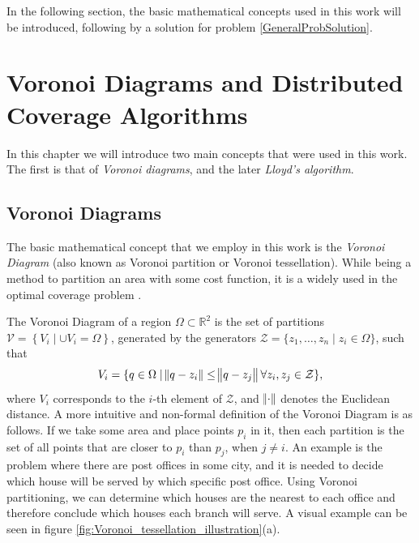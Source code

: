 \documentclass{iacas}
\newcommand{\rsqr}{\mathbb{R}^2}
\begin{document}
In the following section, the basic mathematical concepts used in this work will be introduced, following by a solution for problem \ref{GeneralProbSolution}.

\section{Voronoi Diagrams and Distributed Coverage Algorithms}
In this chapter we will introduce two main concepts that were used in this work. The first is that of \emph{Voronoi diagrams}, and the later \emph{Lloyd's algorithm}.
\subsection{Voronoi Diagrams}
The basic mathematical concept that we employ in this work is the \emph{Voronoi Diagram} (also known as Voronoi partition or Voronoi tessellation). While being a method to partition an area with some cost function, it is a widely used in the optimal coverage problem \cite{Cortes2004,Hussein2007, Du1999}. 

The Voronoi Diagram of a region $\Omega \subset \rsqr$ is the set of partitions $\mathcal{V} = \left\{V_{i} \mid \cup V_{i} = \Omega\right\}$, generated by the generators $\mathcal{Z} = \{z_1,\ldots,z_n\mid z_{i} \in \Omega\}$, such that
\begin{equation} \label{Voronoi Definition}
V_{i} = \{q\in\Omega \mid \norm{q - z_i} \leq \norm{q - z_j} \forall z_i,z_j\in\mathcal{Z}\},
\end{equation}
where $V_{i}$ corresponds to the $i$-th element of $\mathcal{Z}$, and $\norm{\cdot}$ denotes the Euclidean distance.
%
A more intuitive and non-formal definition of the Voronoi Diagram is as follows. If we take some area and place points $p_i$ in it, then each partition is the set of all points that are closer to $p_i$ than $p_j$, when $j \neq i$. An example is the problem where there are post offices in some city, and it is needed to decide which house will be served by which specific post office. Using Voronoi partitioning, we can determine which houses are the nearest to each office and therefore conclude which houses each branch will serve. A visual example can be seen in figure \ref{fig:Voronoi_tessellation_illustration}(a).
\end{document}
